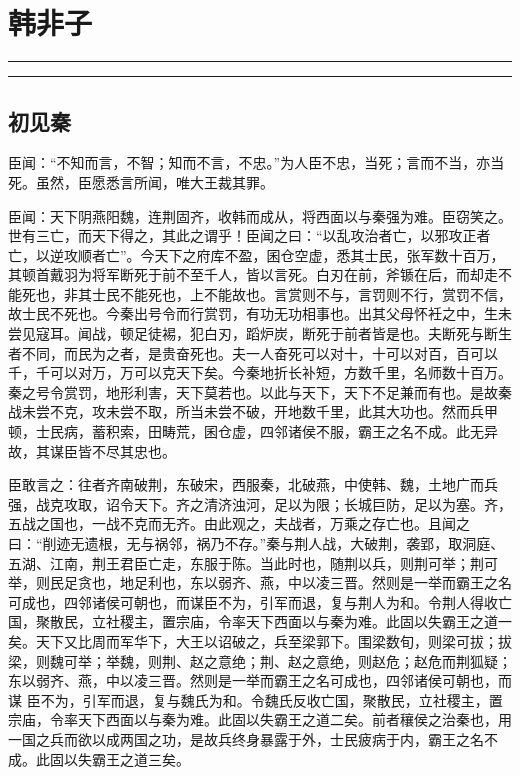 \documentclass[]{article}
\date{}
\begin{document}
\hypertarget{header-n804}{%
\section{韩非子}\label{header-n804}}

\begin{center}\rule{0.5\linewidth}{\linethickness}\end{center}

\tableofcontents

\begin{center}\rule{0.5\linewidth}{\linethickness}\end{center}

\hypertarget{header-n810}{%
\subsection{初见秦}\label{header-n810}}

臣闻：``不知而言，不智；知而不言，不忠。''为人臣不忠，当死；言而不当，亦当死。虽然，臣愿悉言所闻，唯大王裁其罪。

臣闻：天下阴燕阳魏，连荆固齐，收韩而成从，将西面以与秦强为难。臣窃笑之。世有三亡，而天下得之，其此之谓乎！臣闻之曰：``以乱攻治者亡，以邪攻正者亡，以逆攻顺者亡''。今天下之府库不盈，囷仓空虚，悉其士民，张军数十百万，其顿首戴羽为将军断死于前不至千人，皆以言死。白刃在前，斧锧在后，而却走不能死也，非其士民不能死也，上不能故也。言赏则不与，言罚则不行，赏罚不信，故士民不死也。今秦出号令而行赏罚，有功无功相事也。出其父母怀衽之中，生未尝见寇耳。闻战，顿足徒裼，犯白刃，蹈炉炭，断死于前者皆是也。夫断死与断生者不同，而民为之者，是贵奋死也。夫一人奋死可以对十，十可以对百，百可以千，千可以对万，万可以克天下矣。今秦地折长补短，方数千里，名师数十百万。秦之号令赏罚，地形利害，天下莫若也。以此与天下，天下不足兼而有也。是故秦战未尝不克，攻未尝不取，所当未尝不破，开地数千里，此其大功也。然而兵甲顿，士民病，蓄积索，田畴荒，囷仓虚，四邻诸侯不服，霸王之名不成。此无异故，其谋臣皆不尽其忠也。

臣敢言之：往者齐南破荆，东破宋，西服秦，北破燕，中使韩、魏，土地广而兵强，战克攻取，诏令天下。齐之清济浊河，足以为限；长城巨防，足以为塞。齐，五战之国也，一战不克而无齐。由此观之，夫战者，万乘之存亡也。且闻之曰：``削迹无遗根，无与祸邻，祸乃不存。''秦与荆人战，大破荆，袭郢，取洞庭、五湖、江南，荆王君臣亡走，东服于陈。当此时也，随荆以兵，则荆可举；荆可举，则民足贪也，地足利也，东以弱齐、燕，中以凌三晋。然则是一举而霸王之名可成也，四邻诸侯可朝也，而谋臣不为，引军而退，复与荆人为和。令荆人得收亡国，聚散民，立社稷主，置宗庙，令率天下西面以与秦为难。此固以失霸王之道一矣。天下又比周而军华下，大王以诏破之，兵至梁郭下。围梁数旬，则梁可拔；拔梁，则魏可举；举魏，则荆、赵之意绝；荆、赵之意绝，则赵危；赵危而荆狐疑；东以弱齐、燕，中以凌三晋。然则是一举而霸王之名可成也，四邻诸侯可朝也，而谋
臣不为，引军而退，复与魏氏为和。令魏氏反收亡国，聚散民，立社稷主，置宗庙，令率天下西面以与秦为难。此固以失霸王之道二矣。前者穰侯之治秦也，用一国之兵而欲以成两国之功，是故兵终身暴露于外，士民疲病于内，霸王之名不成。此固以失霸王之道三矣。
\end{document}
